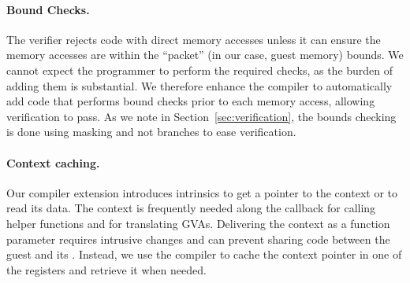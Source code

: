 \documentclass[11pt]{article}
\begin{document}


\paragraph{Bound Checks.}
The verifier rejects code with direct memory accesses unless it can ensure
the memory accesses are within the ``packet'' (in our case, guest memory) bounds.
We cannot expect the \hypercallback{} programmer to perform the required checks, 
as the burden of adding them is substantial. We therefore enhance the compiler 
to automatically add code that performs bound checks prior to each memory access,
allowing verification to pass. As we note in Section~\ref{sec:verification}, 
the bounds checking is done using masking and not branches to ease verification.


\paragraph{Context caching.}
Our compiler extension introduces 
intrinsics to get a pointer to the context or to read its data. The context
is frequently needed along the callback for calling helper functions
and for translating GVAs. Delivering the context
as a function parameter requires intrusive 
changes and can prevent sharing code between the guest and its \hypercallback.
Instead, we use the compiler to cache the context pointer in one of the registers
and retrieve it when needed.
\end{document}
